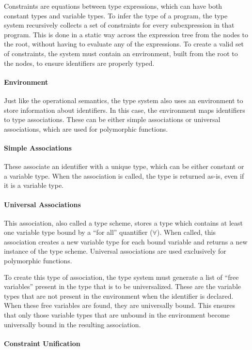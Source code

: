 \documentclass{article}
\begin{document}
Constraints are equations between type expressions, which can have both constant types and variable types.
To infer the type of a program, the type system recursively collects a set of constraints for every subexpression in that program.
This is done in a static way across the expression tree from the nodes to the root, without having to evaluate any of the expressions.
To create a valid set of constraints, the system must contain an environment, built from the root to the nodes, to ensure identifiers are properly typed.

\paragraph{Environment}
Just like the operational semantics, the type system also uses an environment to store information about identifiers.
In this case, the environment maps identifiers to type associations.
These can be either simple associations or universal associations, which are used for polymorphic functions.

\paragraph{Simple Associations}
These associate an identifier with a unique type, which can be either constant or a variable type.
When the association is called, the type is returned as-is, even if it is a variable type.

\paragraph{Universal Associations}
This association, also called a type scheme, stores a type which contains at least one variable type bound by a ``for all'' quantifier ($\forall$).
When called, this association creates a new variable type for each bound variable and returns a new instance of the type scheme.
Universal associations are used exclusively for polymorphic functions.

To create this type of association, the type system must generate a list of ``free variables'' present in the type that is to be universalized.
These are the variable types that are not present in the environment when the identifier is declared.
When these free variables are found, they are universally bound.
This ensures that only those variable types that are unbound in the environment become universally bound in the resulting association.

\paragraph{Constraint Unification}
\end{document}

